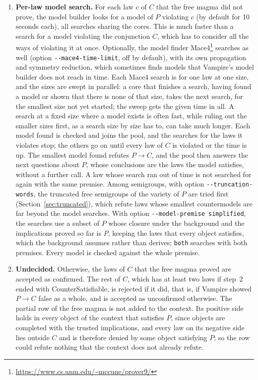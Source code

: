 \documentclass[11pt,a4paper]{article}
\theoremstyle{definition}
\theoremstyle{remark}
\newcommand{\code}[1]{\texttt{#1}}
\begin{document}
\begin{enumerate}
  \item \textbf{Per-law model search.} For each law $c$ of $C$ that the free magma did not prove, the model builder looks for a model of $P$ violating $c$ (by default for 10 seconds each), all searches sharing the cores. This is much faster than a search for a model violating the conjunction $C$, which has to consider all the ways of violating it at once. Optionally, the model finder Mace4\footnote{\url{https://www.cs.unm.edu/~mccune/prover9/}} searches as well (option \code{-{}-mace4-time-limit}, off by default), with its own propagation and symmetry reduction, which sometimes finds models that Vampire's model builder does not reach in time. Each Mace4 search is for one law at one size, and the sizes are swept in parallel: a core that finishes a search, having found a model or shown that there is none of that size, takes the next search, for the smallest size not yet started; the sweep gets the given time in all. A search at a fixed size where a model exists is often fast, while ruling out the smaller sizes first, as a search size by size has to, can take much longer. Each model found is checked and joins the pool, and the searches for the laws it violates stop; the others go on until every law of $C$ is violated or the time is up. The smallest model found refutes $P \to C$, and the pool then answers the next questions about $P$, whose conclusions are the laws the model satisfies, without a further call. A law whose search ran out of time is not searched for again with the same premise. Among semigroups, with option \code{-{}-truncation-words}, the truncated free semigroups of the variety of $P$ are tried first (Section~\ref{sec:truncated}), which refute laws whose smallest countermodels are far beyond the model searches. With option \code{-{}-model-premise simplified}, the searches use a subset of $P$ whose closure under the background and the implications proved so far is $P$, keeping the laws that every object satisfies, which the background assumes rather than derives; \code{both} searches with both premises. Every model is checked against the whole premise.
  \item \textbf{Undecided.} Otherwise, the laws of $C$ that the free magma proved are accepted as confirmed. The rest of $C$, which has at least two laws if step~2 ended with CounterSatisfiable, is rejected if it did, that is, if Vampire showed $P \to C$ false as a whole, and is accepted as unconfirmed otherwise. The partial row of the free magma is not added to the context. Its positive side holds in every object of the context that satisfies $P$, since objects are completed with the trusted implications, and every law on its negative side lies outside $C$ and is therefore denied by some object satisfying $P$; so the row could refute nothing that the context does not already refute.
\end{enumerate}
\end{document}
